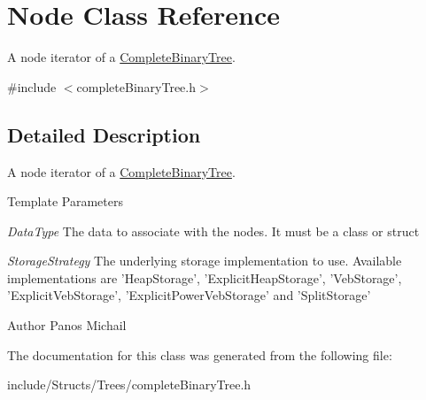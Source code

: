 \hypertarget{class_node}{
\section{Node Class Reference}
\label{class_node}
}


A node iterator of a \hyperlink{class_complete_binary_tree}{CompleteBinaryTree}.  




{\ttfamily \#include $<$completeBinaryTree.h$>$}



\subsection{Detailed Description}
A node iterator of a \hyperlink{class_complete_binary_tree}{CompleteBinaryTree}. 
\begin{DoxyTemplParams}{Template Parameters}
\item[{\em DataType}]The data to associate with the nodes. It must be a class or struct \item[{\em StorageStrategy}]The underlying storage implementation to use. Available implementations are 'HeapStorage', 'ExplicitHeapStorage', 'VebStorage', 'ExplicitVebStorage', 'ExplicitPowerVebStorage' and 'SplitStorage' \end{DoxyTemplParams}
\begin{DoxyAuthor}{Author}
Panos Michail 
\end{DoxyAuthor}


The documentation for this class was generated from the following file:\begin{DoxyCompactItemize}
\item 
include/Structs/Trees/completeBinaryTree.h\end{DoxyCompactItemize}
